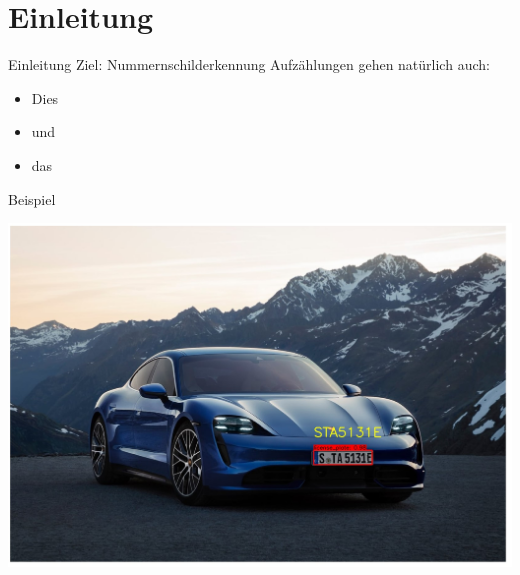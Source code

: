 \section{Einleitung}

\begin{frame}{Einleitung}
    Ziel: Nummernschilderkennung
    Aufz\"ahlungen gehen nat\"urlich auch:
    \begin{itemize}
        \item Dies
        \item und
        \item das
    \end{itemize}
\end{frame}

\begin{frame}{Beispiel}
  \usepackage{graphicx} 
  \includegraphics{Bild2}
\end{frame}
